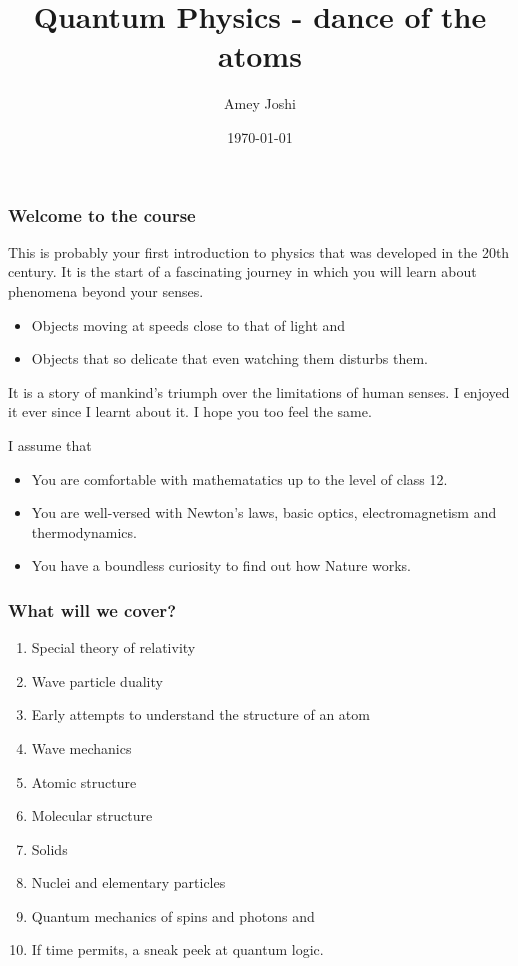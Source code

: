 \documentclass{beamer}
\title{Quantum Physics - dance of the atoms}
\author{Amey Joshi}
\date{\today}
\begin{document}
\begin{frame}
\titlepage
\end{frame}

\begin{frame}
\frametitle{Welcome to the course}
This is probably your first introduction to physics that was developed in the
20th century. It is the start of a fascinating journey in which you will learn
about phenomena beyond your senses.
\begin{itemize}
\item Objects moving at speeds close to that of light and
\item Objects that so delicate that even watching them disturbs them.
\end{itemize}
It is a story of mankind's triumph over the limitations of human senses. I
enjoyed it ever since I learnt about it. I hope you too feel the same.

I assume that
\begin{itemize}
\item You are comfortable with mathematatics up to the level of class 12.
\item You are well-versed with Newton's laws, basic optics, electromagnetism
and thermodynamics.
\item You have a boundless curiosity to find out how Nature works.
\end{itemize}
\end{frame}

\begin{frame}
\frametitle{What will we cover?}
\begin{enumerate}
\item Special theory of relativity
\item Wave particle duality
\item Early attempts to understand the structure of an atom
\item Wave mechanics
\item Atomic structure
\item Molecular structure
\item Solids
\item Nuclei and elementary particles
\item Quantum mechanics of spins and photons and
\item If time permits, a sneak peek at quantum logic.
\end{enumerate}
\end{frame}
\end{document}
